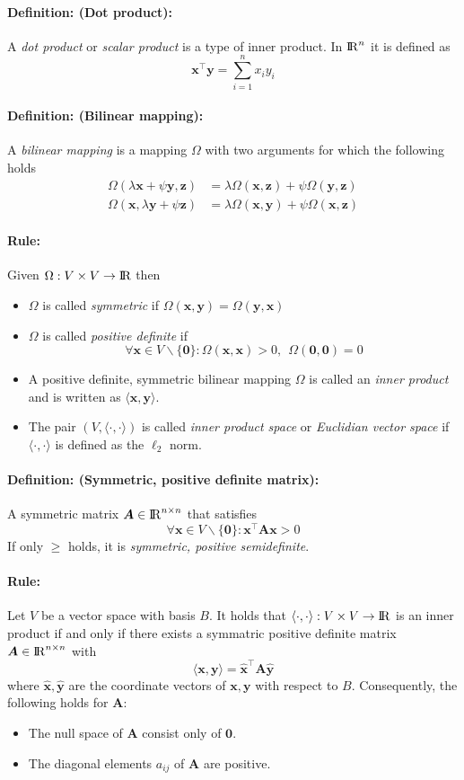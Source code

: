 \documentclass[12pt]{article}
\newcommand{\R}{{\rm I\!R}}
\newcommand{\bx}{{\bm{x}}}
\newcommand{\by}{{\bm{y}}}
\newcommand{\bz}{{\bm{z}}}
\newcommand{\A}{{\bm{A}}}
\newcommand{\0}[0]{\bm{0}}
\newcommand{\ipr}[1]{\langle #1 \rangle}
\newcommand{\xdefinition}[2]{\paragraph{\colorbox{#1!30}{\textbf{Definition:}} (#2):}}
\newcommand{\xrule}[1]{\paragraph{\colorbox{#1!30}{\textbf{Rule:}}}}
\begin{document}
\xdefinition{blue}{Dot product} A \textit{dot product} or \textit{scalar product} is a type of inner product. In $\R^n$ it is defined as
%
\begin{equation}
	\bx^\top \by = \sum\limits_{i=1}^{n} x_i y_i
\end{equation}

\xdefinition{red}{Bilinear mapping} A \textit{bilinear mapping} is a mapping $\Omega$ with two arguments for which the following holds
%
\begin{equation}
\begin{aligned}
	\Omega(\lambda \bx + \psi \by, \bz) &= \lambda \Omega(\bx, \bz) + \psi\Omega(\by, \bz) \\
	\Omega(\bx, \lambda \by + \psi\bz) &= \lambda \Omega(\bx, \by) + \psi\Omega(\bx, \bz)
\end{aligned}
\end{equation}

\xrule{red} Given $\Omega : V \times V \rightarrow \R$ then
%
\begin{itemize}
	\item $\Omega$ is called \textit{symmetric} if $\Omega(\bx, \by) = \Omega(\by, \bx)$
	\item $\Omega$ is called \textit{positive definite} if
	\begin{equation}
		\forall \bx \in V \backslash \{\0\} : \Omega(\bx, \bx) > 0, \ \ \Omega(\0, \0) = 0
	\end{equation}
	\item A positive definite, symmetric bilinear mapping $\Omega$ is called an \textit{inner product} and is written as $\ipr{\bx, \by}$.
	\item The pair $(V, \ipr{\cdot, \cdot})$ is called \textit{inner product space} or \textit{Euclidian vector space} if $\ipr{\cdot, \cdot}$ is defined as the $\ell_2$ norm.
\end{itemize}

\xdefinition{red}{Symmetric, positive definite matrix} A symmetric matrix $\A \in \R^{n \times n}$ that satisfies
%
\begin{equation}
	\forall \bx \in V \backslash \{\0\} : \bx^\top \A \bx > 0
\end{equation}
%
If only $\geqslant$ holds, it is \textit{symmetric, positive semidefinite}.

\xrule{red} Let $V$ be a vector space with basis $B$. It holds that $\ipr{\cdot, \cdot} : V \times V \rightarrow \R$ is an inner product if and only if there exists a symmatric positive definite matrix $\A \in \R^{n \times n}$ with
%
\begin{equation}
	\ipr{\bx, \by} = \hat{\bx}^\top \A \hat{\by}
\end{equation}
%
where $\hat{\bx}, \hat{\by}$ are the coordinate vectors of $\bx, \by$ with respect to $B$. Consequently, the following holds for $\A$:
%
\begin{itemize}
	\item The null space of $\A$ consist only of $\0$.
	\item The diagonal elements $a_{ij}$ of $\A$ are positive.
\end{itemize}
\end{document}
